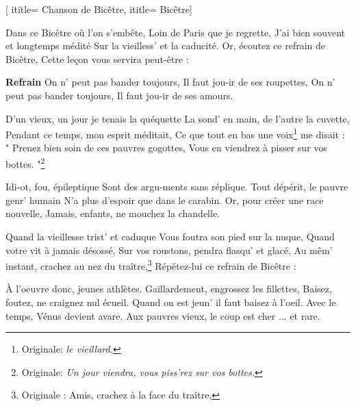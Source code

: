  [
ititle= {Chanson de Bicêtre},
ititle= {Bicêtre}]


\beginverse
Dans ce Bicêtre où l'on s'embête,
Loin de Paris que je regrette,
J'ai bien souvent et longtemps médité
Sur la vieilless' et la caducité.
Or, écoutez ce refrain de Bicêtre,
Cette leçon vous servira peut-être :
\endverse

\beginchorus
\textbf {Refrain}
On n' peut pas bander toujours,
Il faut jou-ir de ses roupettes,
On n' peut pas bander toujours,
Il faut jou-ir de ses amours.
\endchorus

\beginverse
D'un vieux, un jour je tenais la quéquette
La sond' en main, de l'autre la cuvette,
Pendant ce temps, mon esprit méditait,
Ce que tout en bas une voix\footnote {Originale: \emph{le vieillard.}} me disait :
" Prenez bien soin de ces pauvres gogottes,
Vous en viendrez à pisser sur vos bottes. "\footnote {Originale: \emph{Un jour viendra, vous piss'rez sur vos bottes.}}
\endverse

\beginverse
Idi-ot, fou, épileptique
Sont des argu-ments sans réplique.
Tout dépérit, le pauvre genr' humain
N'a plus d'espoir que dans le carabin.
Or, pour créer une race nouvelle,
Jamais, enfants, ne mouchez la chandelle.
\endverse

\beginverse
Quand la vieillesse trist' et caduque
Vous foutra son pied sur la nuque,
Quand votre vit à jamais désossé,
Sur vos roustons, pendra flasqu' et glacé,
Au mêm' instant, crachez au nez du traître,\footnote {Originale : Amis, crachez à la face du traître,}
Répétez-lui ce refrain de Bicêtre :
\endverse

\beginverse
À l'oeuvre donc, jeunes athlètes.
Gaillardement, engrossez les fillettes,
Baisez, foutez, ne craignez nul écueil.
Quand on est jeun' il faut baisez à l'oeil.
Avec le temps, Vénus devient avare.
Aux pauvres vieux, le coup est cher ... et rare.
\endverse

\endsong